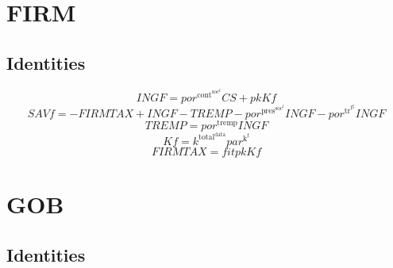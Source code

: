 \section{FIRM}

\subsection{Identities}

\begin{equation}
{I\!N\!G\!F} = {{p\!o\!r}^{\mathrm{cont}^{\mathrm{soc}^{\mathrm{f}}}}} {{C\!S}} + {{p\!k}} {{K\!f}}
\end{equation}
\begin{equation}
{S\!A\!V\!f} = -{F\!I\!R\!M\!T\!A\!X} + {I\!N\!G\!F} - {T\!R\!E\!M\!P} - {{p\!o\!r}^{\mathrm{pres}^{\mathrm{soc}^{\mathrm{f}}}}} {{I\!N\!G\!F}} - {{p\!o\!r}^{\mathrm{tr}^{\mathrm{f}^{\mathrm{g}}}}} {{I\!N\!G\!F}}
\end{equation}
\begin{equation}
{T\!R\!E\!M\!P} = {{p\!o\!r}^{\mathrm{tremp}}} {{I\!N\!G\!F}}
\end{equation}
\begin{equation}
{K\!f} = {k^{\mathrm{total}^{\mathrm{data}}}} {{p\!a\!r}^{\mathrm{k}^{\mathrm{f}}}}
\end{equation}
\begin{equation}
{F\!I\!R\!M\!T\!A\!X} = {{f\!i\!t}} {{p\!k}} {{K\!f}}
\end{equation}




\section{GOB}

\subsection{Identities}

